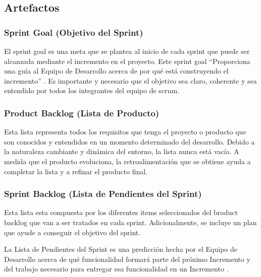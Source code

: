 \subsection{Artefactos}

\subsubsection{Sprint Goal (Objetivo del Sprint)}

El sprint goal es una meta que se plantea al inicio de cada sprint que puede ser alcanzada mediante el incremento en el proyecto. Este sprint goal ``Proporciona una guía al Equipo de Desarrollo acerca de por qué está construyendo el incremento'' \cite{scrum_guide}. Es importante y necesario que el objetivo sea claro, coherente y sea entendido por todos los integrantes del equipo de scrum.

\subsubsection{Product Backlog (Lista de Producto)}

Esta lista representa todos los requisitos que tenga el proyecto o producto que son conocidos y entendidos en un momento determinado del desarrollo. Debido a la naturaleza cambiante y dinámica del entorno, la lista nunca está vacía. A medida que el producto evoluciona, la retroalimentación que se obtiene ayuda a completar la lista y a refinar el producto final.

\subsubsection{Sprint Backlog (Lista de Pendientes del Sprint)}

Esta lista esta compuesta por los diferentes items seleccionados del broduct backlog que van a ser tratados en cada sprint. Adicionalmente, se incluye un plan que ayude a conseguir el objetivo del sprint.
	
La Lista de Pendientes del Sprint es una predicción hecha por el Equipo de Desarrollo acerca de qué funcionalidad formará parte del próximo Incremento y del trabajo necesario para entregar esa funcionalidad en un Incremento \cite{scrum_guide}.
